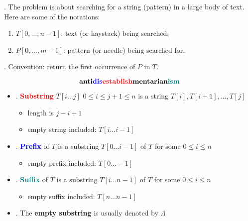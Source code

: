 \documentclass{article}
\begin{document}
\begin{deff}.
    The problem is about searching for a string (pattern) in a large body of text. Here are some of the notations: \begin{enumerate}
        \item $T[0, \ldots, n - 1]$: text (or haystack) being searched; 
        \item $P[0, \ldots, m - 1]$: pattern (or needle) being searched for. 
    \end{enumerate}
    \begin{comm}[].
        Convention: return the first occurrence of $P$ in $T$. 
    \end{comm}
\end{deff}

\[ \textbf{\textcolor{black}{anti}}\textbf{\textcolor{blue}{dis}}\textbf{\textcolor{red}{establish}}\textbf{\textcolor{black}{mentarian}}\textbf{\textcolor{teal}{ism}} \]

\begin{itemize}
    \item \begin{deff}.
        \textbf{\textcolor{red}{Substring}} $T[i \dots j]$ \quad $0 \leq i \leq j + 1 \leq n$ is a string $T[i], T[i+1], \dots, T[j]$
        \begin{itemize}
            \item length is $j - i + 1$
            \item empty string included: $T[i \dots i - 1]$
        \end{itemize}
    \end{deff} 
    
    \item \begin{deff}.
        \textbf{\textcolor{blue}{Prefix}} of $T$ is a substring $T[0 \dots i - 1]$ of $T$ for some $0 \leq i \leq n$
        \begin{itemize}
            \item empty prefix included: $T[0 \dots -1]$
        \end{itemize}
    \end{deff} 
    
    \item \begin{deff}.
        \textbf{\textcolor{teal}{Suffix}} of $T$ is a substring $T[i \dots n-1]$ of $T$ for some $0 \leq i \leq n$
        \begin{itemize}
            \item empty suffix included: $T[n \dots n-1]$
        \end{itemize}
    \end{deff} 

    \item \begin{deff}.
        The \textbf{empty substring} is usually denoted by $\Lambda$
    \end{deff}
\end{itemize}
\end{document}
